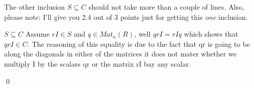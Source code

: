 \documentclass[11pt]{article}
\begin{document}
The other inclusion \(S\subseteq C\) should not take more than a couple of lines.  Also, please note:  I'll give you 2.4 out of 3 points just for getting this \emph{one} inclusion. 

\proof
{
\(S\subseteq C\)
    Assume \(rI \in S\) and \(q \in Mat_n(R) \), well \(qrI = rIq\) which shows that \(qrI \in C\). The reasoning of this equality is due to the fact that qr is going to be along the diagonals in either of the matrices it does not mater whether we multiply I by the scalars qr or the matrix rI bay any scalar.
    
}

\qed
\end{document}
